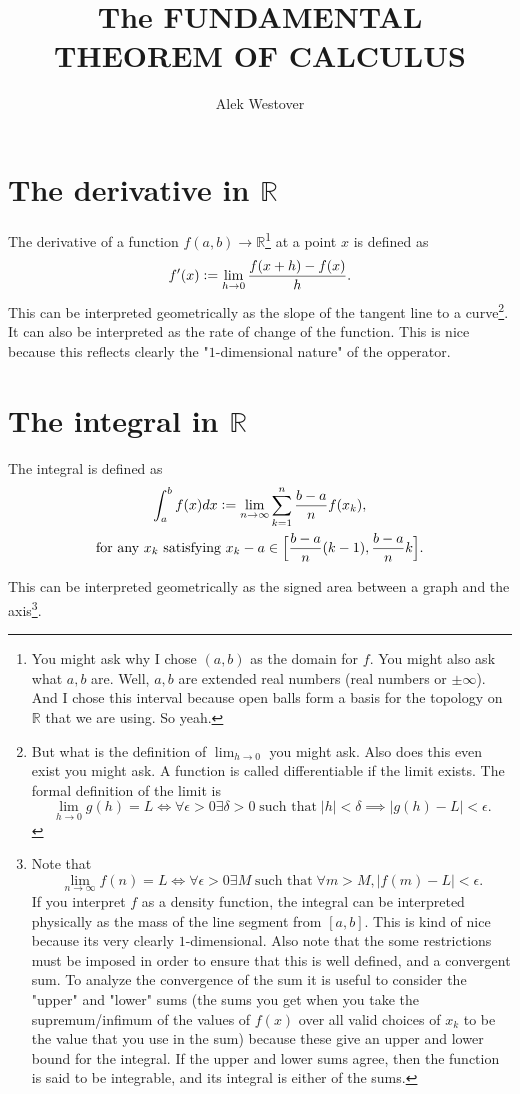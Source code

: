 \documentclass{article}[11pt]
\title{The FUNDAMENTAL THEOREM OF CALCULUS}
\author{Alek Westover}
\DeclareMathOperator{\st}{\text{ such that }}
\newcommand{\defeq}{\vcentcolon=}
\begin{document}
\maketitle
\tableofcontents

\section{The derivative in $\mathbb{R}$}
The derivative of a function $f (a,b) \to \mathbb{R}$\footnote{You might ask why I chose $(a,b)$ as the domain for $f$. You might also ask what $a, b$ are. Well, $a,b$ are extended real numbers (real numbers or $\pm \infty$). And I chose this interval because open balls form a basis for the topology on $\mathbb{R}$ that we are using. So yeah.} at a point $x$ is defined as 
$$f'(x) \defeq \lim_{h\to 0} \frac{f(x+h)-f(x)}{h}.$$
This can be interpreted geometrically as the slope of the tangent line to a curve\footnote{
But what is the definition of $\lim_{h\to 0}$ you might ask. Also does this even exist you might ask. A function is called differentiable if the limit exists. The formal definition of the limit is $$\lim_{h\to 0}g(h) = L \iff \forall \epsilon > 0 \exists \delta > 0 \st |h| < \delta \implies |g(h)-L| < \epsilon.$$ }.
It can also be interpreted as the rate of change of the function. This is nice because this reflects clearly the "$1$-dimensional nature" of the opperator.

\section{The integral in $\mathbb{R}$}
The integral is defined as 
\begin{multline*}
\int_{a}^{b}f(x) dx \defeq \lim_{n\to\infty} \sum_{k=1}^n \frac{b-a}{n} f(x_k), \\
\text{for any $x_k$ satisfying $x_k-a\in\Big[\frac{b-a}{n}(k-1), \frac{b-a}{n}k\Big]$}.
\end{multline*}

This can be interpreted geometrically as the signed area between a graph and the axis\footnote{Note that $$\lim_{n\to\infty}f(n) = L \iff \forall \epsilon>0 \exists M \st \forall m>M, |f(m)-L| < \epsilon.$$
	If you interpret $f$ as a density function, the integral can be interpreted physically as the mass of the line segment from $[a, b]$. This is kind of nice because its very clearly $1$-dimensional.
Also note that the some restrictions must be imposed in order to ensure that this is well defined, and a convergent sum. 
To analyze the convergence of the sum it is useful to consider the "upper" and "lower" sums (the sums you get when you take the supremum/infimum of the values of $f(x)$ over all valid choices of $x_k$ to be the value that you use in the sum) because these give an upper and lower bound for the integral.
If the upper and lower sums agree, then the function is said to be integrable, and its integral is either of the sums.
}.
\end{document}

